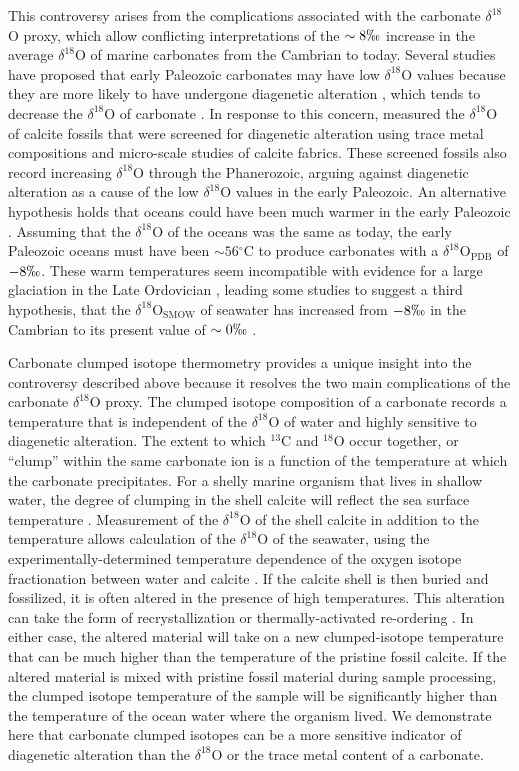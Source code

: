\documentclass[5p, authoryear]{elsarticle}
\newcommand{\deltao}{$\delta^{18}$}
\newcommand{\degrees}{$^{\circ}$}
\begin{document}
This controversy arises from the complications associated with the carbonate \deltao O proxy, which allow conflicting interpretations of the $\sim 8\permil$ increase in the average \deltao O of marine carbonates from the Cambrian to today. Several studies have proposed that early Paleozoic carbonates may have low \deltao O values because they are more likely to have undergone diagenetic alteration \citep{Clayton1959,Keith1964,Land1995}, which tends to decrease the \deltao O of carbonate \citep{Marshall1992}. In response to this concern, \cite{Veizer1999} measured the \deltao O of calcite fossils that were screened for diagenetic alteration using trace metal compositions and micro-scale studies of calcite fabrics. These screened fossils also record increasing \deltao O through the Phanerozoic, arguing against diagenetic alteration as a cause of the low \deltao O values in the early Paleozoic. An alternative hypothesis holds that oceans could have been much warmer in the early Paleozoic \citep{Karhu1986,Knauth1976}. Assuming that the \deltao O of the oceans was the same as today, the early Paleozoic oceans must have been $\sim 56$\degrees C to produce carbonates with a \deltao O$_{\text{PDB}}$ of $-8\permil$. These warm temperatures seem incompatible with evidence for a large glaciation in the Late Ordovician \citep{Veizer1986}, leading some studies to suggest a third hypothesis, that the \deltao O$_{\text{SMOW}}$ of seawater has increased from $-8\permil$ in the Cambrian to its present value of $\sim 0\permil$ \citep{Jaffres2007,Veizer1999}. 

Carbonate clumped isotope thermometry provides a unique insight into the controversy described above because it resolves the two main complications of the carbonate \deltao O proxy. The clumped isotope composition of a carbonate records a temperature that is independent of the \deltao O of water and highly sensitive to diagenetic alteration. The extent to which $^{13}$C and $^{18}$O occur together, or ``clump'' within the same carbonate ion is a function of the temperature at which the carbonate precipitates. For a shelly marine organism that lives in shallow water, the degree of clumping in the shell calcite will reflect the sea surface temperature \citep{Ghosh2006}. Measurement of the \deltao O of the shell calcite in addition to the temperature allows calculation of the \deltao O of the seawater, using the experimentally-determined temperature dependence of the oxygen isotope fractionation between water and calcite \citep{Kim1997}. If the calcite shell is then buried and fossilized, it is often altered in the presence of high temperatures. This alteration can take the form of recrystallization or thermally-activated re-ordering \citep{Eiler2011}. In either case, the altered material will take on a new clumped-isotope temperature that can be much higher than the temperature of the pristine fossil calcite. If the altered material is mixed with pristine fossil material during sample processing, the clumped isotope temperature of the sample will be significantly higher than the temperature of the ocean water where the organism lived. We demonstrate here that carbonate clumped isotopes can be a more sensitive indicator of diagenetic alteration than the \deltao O or the trace metal content of a carbonate. 
\end{document}
